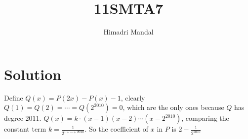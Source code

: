 \documentclass[11pt]{scrartcl}
\title{11SMTA7}
\author{Himadri Mandal}
\begin{document}
\maketitle

\section{Solution}
\begin{soln}
  Define $Q(x) = P(2x) - P(x) - 1$, clearly $Q(1) = Q(2) = \cdots = Q(2^{2010}) = 0$, which are the only ones because 
  $Q$ has degree $2011$.
  $Q(x) = k \cdot (x - 1)(x - 2) \cdots (x - 2^{2010})$, comparing the constant term $k = \frac1{2^{1 + \cdots + 2010}}$.
  So the coefficient of $x$ in $P$ is $2 - \frac1{2^{2010}}$
\end{soln}
\end{document}
